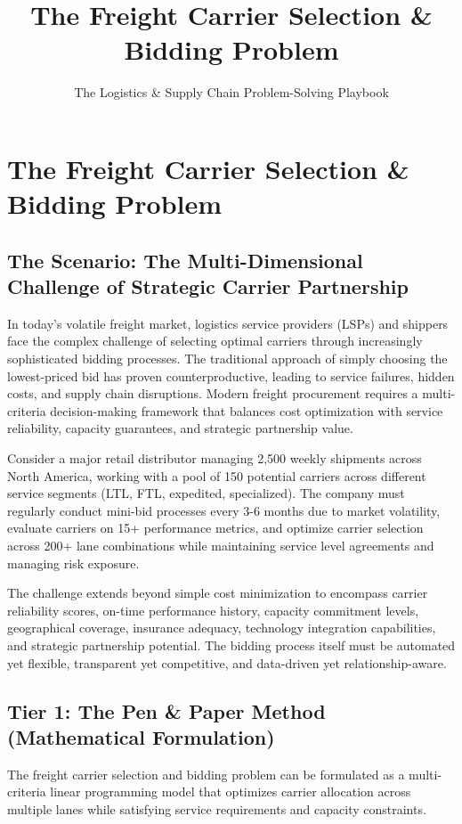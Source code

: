 \documentclass{article}
\title{The Freight Carrier Selection \& Bidding Problem}
\author{The Logistics \& Supply Chain Problem-Solving Playbook}
\date{}
\begin{document}
\maketitle

\section{The Freight Carrier Selection \& Bidding Problem}

\subsection{The Scenario: The Multi-Dimensional Challenge of Strategic Carrier Partnership}

In today's volatile freight market, logistics service providers (LSPs) and shippers face the complex challenge of selecting optimal carriers through increasingly sophisticated bidding processes. The traditional approach of simply choosing the lowest-priced bid has proven counterproductive, leading to service failures, hidden costs, and supply chain disruptions. Modern freight procurement requires a multi-criteria decision-making framework that balances cost optimization with service reliability, capacity guarantees, and strategic partnership value.

Consider a major retail distributor managing 2,500 weekly shipments across North America, working with a pool of 150 potential carriers across different service segments (LTL, FTL, expedited, specialized). The company must regularly conduct mini-bid processes every 3-6 months due to market volatility, evaluate carriers on 15+ performance metrics, and optimize carrier selection across 200+ lane combinations while maintaining service level agreements and managing risk exposure.

The challenge extends beyond simple cost minimization to encompass carrier reliability scores, on-time performance history, capacity commitment levels, geographical coverage, insurance adequacy, technology integration capabilities, and strategic partnership potential. The bidding process itself must be automated yet flexible, transparent yet competitive, and data-driven yet relationship-aware.

\subsection{Tier 1: The Pen \& Paper Method (Mathematical Formulation)}

The freight carrier selection and bidding problem can be formulated as a multi-criteria linear programming model that optimizes carrier allocation across multiple lanes while satisfying service requirements and capacity constraints.
\end{document}
